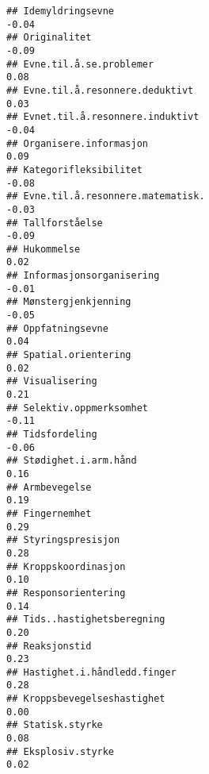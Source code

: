\documentclass[
]{article}
\begin{document}
\begin{verbatim}
## Idemyldringsevne                                                                 -0.04
## Originalitet                                                                     -0.09
## Evne.til.å.se.problemer                                                           0.08
## Evne.til.å.resonnere.deduktivt                                                    0.03
## Evnet.til.å.resonnere.induktivt                                                  -0.04
## Organisere.informasjon                                                            0.09
## Kategorifleksibilitet                                                            -0.08
## Evne.til.å.resonnere.matematisk.                                                 -0.03
## Tallforståelse                                                                   -0.09
## Hukommelse                                                                        0.02
## Informasjonsorganisering                                                         -0.01
## Mønstergjenkjenning                                                              -0.05
## Oppfatningsevne                                                                   0.04
## Spatial.orientering                                                               0.02
## Visualisering                                                                     0.21
## Selektiv.oppmerksomhet                                                           -0.11
## Tidsfordeling                                                                    -0.06
## Stødighet.i.arm.hånd                                                              0.16
## Armbevegelse                                                                      0.19
## Fingernemhet                                                                      0.29
## Styringspresisjon                                                                 0.28
## Kroppskoordinasjon                                                                0.10
## Responsorientering                                                                0.14
## Tids..hastighetsberegning                                                         0.20
## Reaksjonstid                                                                      0.23
## Hastighet.i.håndledd.finger                                                       0.28
## Kroppsbevegelseshastighet                                                         0.00
## Statisk.styrke                                                                    0.08
## Eksplosiv.styrke                                                                  0.02

\end{verbatim}
\end{document}
